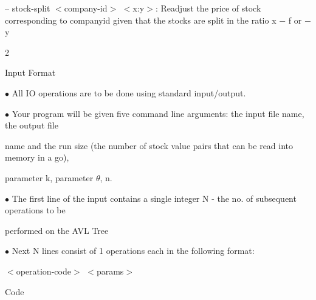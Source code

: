 \documentclass[a4paper,portrait,12pt]{article}
\begin{document}
\begin{flushleft}
-- stock-split $<$company-id$>$ $<$x:y$>$: Readjust the price of stock corresponding to companyid given that the stocks are split in the ratio x $-$ f or $-$ y
\end{flushleft}





2





\begin{flushleft}
Input Format
\end{flushleft}


\begin{flushleft}
$\bullet$ All IO operations are to be done using standard input/output.
\end{flushleft}


\begin{flushleft}
$\bullet$ Your program will be given five command line arguments: the input file name, the output file
\end{flushleft}


\begin{flushleft}
name and the run size (the number of stock value pairs that can be read into memory in a go),
\end{flushleft}


\begin{flushleft}
parameter k, parameter $\theta$, n.
\end{flushleft}


\begin{flushleft}
$\bullet$ The first line of the input contains a single integer N - the no. of subsequent operations to be
\end{flushleft}


\begin{flushleft}
performed on the AVL Tree
\end{flushleft}


\begin{flushleft}
$\bullet$ Next N lines consist of 1 operations each in the following format:
\end{flushleft}


\begin{flushleft}
$<$operation-code$>$ $<$params$>$
\end{flushleft}


\begin{flushleft}
Code
\end{flushleft}
\end{document}
